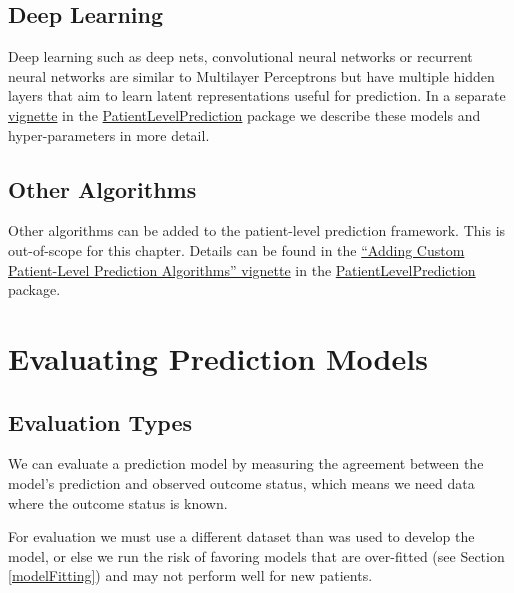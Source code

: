 \documentclass[11pt]{book}
\theoremstyle{definition}
\theoremstyle{definition}
\theoremstyle{definition}
\theoremstyle{remark}
\let\BeginKnitrBlock\begin \let\EndKnitrBlock\end
\begin{document}
\subsection{Deep Learning}\label{deep-learning}

Deep learning such as deep nets, convolutional neural networks or
recurrent neural networks are similar to Multilayer Perceptrons but have
multiple hidden layers that aim to learn latent representations useful
for prediction. In a separate
\href{https://ohdsi.github.io/PatientLevelPrediction/articles/BuildingDeepLearningModels.html}{vignette}
in the
\href{https://ohdsi.github.io/PatientLevelPrediction/}{PatientLevelPrediction}
package we describe these models and hyper-parameters in more detail.
 

\subsection{Other Algorithms}\label{other-algorithms}

Other algorithms can be added to the patient-level prediction framework.
This is out-of-scope for this chapter. Details can be found in the
\href{https://ohdsi.github.io/PatientLevelPrediction/articles/AddingCustomAlgorithms.html}{``Adding
Custom Patient-Level Prediction Algorithms'' vignette} in the
\href{https://ohdsi.github.io/PatientLevelPrediction/}{PatientLevelPrediction}
package.

\section{Evaluating Prediction
Models}\label{evaluating-prediction-models}

\subsection{Evaluation Types}\label{evaluation-types}

We can evaluate a prediction model by measuring the agreement between
the model's prediction and observed outcome status, which means we need
data where the outcome status is known.

\BeginKnitrBlock{rmdimportant}
For evaluation we must use a different dataset than was used to develop
the model, or else we run the risk of favoring models that are
over-fitted (see Section \ref{modelFitting}) and may not perform well
for new patients.
\EndKnitrBlock{rmdimportant}
\end{document}
